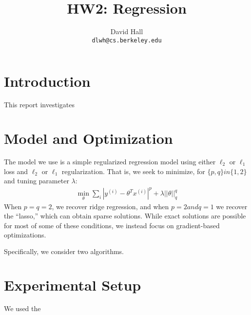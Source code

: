 \documentclass[11pt,leqno,twoside]{article}
\title{HW2: Regression}
\author{David Hall \\ \texttt{dlwh@cs.berkeley.edu}}
\begin{document}
\maketitle

\section{Introduction}

This report investigates 

\section{Model and Optimization}

The model we use is a simple regularized regression model using either $\ell_2$ or $\ell_1$ loss and $\ell_2$ or $\ell_1$
regularization. That is, we seek to minimize, for $\{p,q\} in \{1,2\}$ and tuning parameter $\lambda$:
\begin{equation*}
  \begin{split}
    \min_\theta \sum_i |y^{(i)} - \theta^T x^{(i)}|^p + \lambda ||\theta||_q^q
   \end{split}
 \end{equation*}
When $p=q=2$, we recover ridge regression, and when $p=2 and q=1$
we recover the ``lasso,'' which can obtain sparse solutions. While
exact solutions are possible for most of some of these conditions,
we instead focus on gradient-based optimizations.

Specifically, we consider two algorithms. 



\section{Experimental Setup}

We used the 
\end{document}
